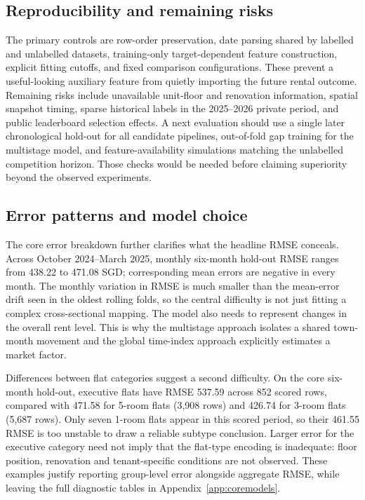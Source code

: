 \documentclass[10pt,a4paper]{article}
\begin{document}
\subsection{Reproducibility and remaining risks}
The primary controls are row-order preservation, date parsing shared by labelled and unlabelled datasets, training-only target-dependent feature construction, explicit fitting cutoffs, and fixed comparison configurations. These prevent a useful-looking auxiliary feature from quietly importing the future rental outcome. Remaining risks include unavailable unit-floor and renovation information, spatial snapshot timing, sparse historical labels in the 2025--2026 private period, and public leaderboard selection effects. A next evaluation should use a single later chronological hold-out for all candidate pipelines, out-of-fold gap training for the multistage model, and feature-availability simulations matching the unlabelled competition horizon. Those checks would be needed before claiming superiority beyond the observed experiments.



\subsection{Error patterns and model choice}
The core error breakdown further clarifies what the headline RMSE conceals. Across October 2024--March 2025, monthly six-month hold-out RMSE ranges from 438.22 to 471.08 SGD; corresponding mean errors are negative in every month. The monthly variation in RMSE is much smaller than the mean-error drift seen in the oldest rolling folds, so the central difficulty is not just fitting a complex cross-sectional mapping. The model also needs to represent changes in the overall rent level. This is why the multistage approach isolates a shared town-month movement and the global time-index approach explicitly estimates a market factor.

Differences between flat categories suggest a second difficulty. On the core six-month hold-out, executive flats have RMSE 537.59 across 852 scored rows, compared with 471.58 for 5-room flats (3,908 rows) and 426.74 for 3-room flats (5,687 rows). Only seven 1-room flats appear in this scored period, so their 461.55 RMSE is too unstable to draw a reliable subtype conclusion. Larger error for the executive category need not imply that the flat-type encoding is inadequate: floor position, renovation and tenant-specific conditions are not observed. These examples justify reporting group-level error alongside aggregate RMSE, while leaving the full diagnostic tables in Appendix~\ref{app:coremodels}.
\end{document}
